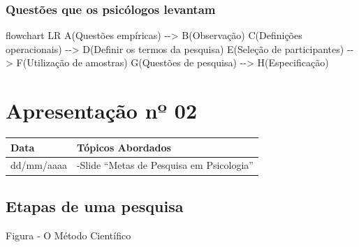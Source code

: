 \documentclass[
]{book}
\newenvironment{Shaded}{\begin{snugshade}}{\end{snugshade}}
\newcommand{\NormalTok}[1]{#1}
\begin{document}
\hypertarget{questuxf5es-que-os-psicuxf3logos-levantam}{%
\subsubsection{Questões que os psicólogos levantam}\label{questuxf5es-que-os-psicuxf3logos-levantam}}

\begin{Shaded}
\begin{Highlighting}[]
\NormalTok{flowchart LR}
\NormalTok{A(Questões empíricas) {-}{-}\textgreater{} B(Observação)}
\NormalTok{C(Definições operacionais) {-}{-}\textgreater{} D(Definir os termos da pesquisa)}
\NormalTok{E(Seleção de participantes) {-}{-}\textgreater{} F(Utilização de amostras)}
\NormalTok{G(Questões de pesquisa) {-}{-}\textgreater{} H(Especificação)}
\end{Highlighting}
\end{Shaded}

\hypertarget{apresentauxe7uxe3o-nuxba-02}{%
\section{Apresentação nº 02}\label{apresentauxe7uxe3o-nuxba-02}}

\begin{longtable}[]{@{}ll@{}}
\toprule()
Data & Tópicos Abordados \\
\midrule()
\endhead
dd/mm/aaaa & -Slide ``Metas de Pesquisa em Psicologia'' \\
\bottomrule()
\end{longtable}

\hypertarget{etapas-de-uma-pesquisa}{%
\subsection{Etapas de uma pesquisa}\label{etapas-de-uma-pesquisa}}

Figura - O Método Científico
\end{document}
